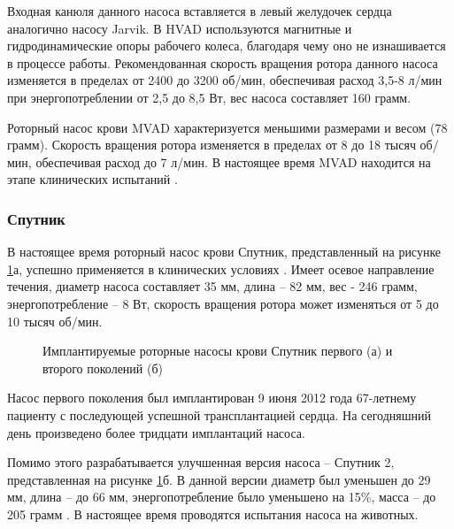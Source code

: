 Входная канюля данного насоса вставляется в левый желудочек сердца аналогично насосу Jarvik. В HVAD используются магнитные и гидродинамические опоры рабочего колеса, благодаря чему оно не изнашивается в процессе работы. Рекомендованная скорость вращения ротора данного насоса изменяется в пределах от 2400 до 3200 об/мин, обеспечивая расход 3,5-8 л/мин при энергопотреблении от 2,5 до 8,5 Вт, вес насоса составляет 160 грамм.

Роторный насос крови MVAD характеризуется меньшими размерами и весом (78 грамм). Скорость вращения ротора изменяется в пределах от 8 до 18 тысяч об/мин, обеспечивая расход до 7 л/мин. В настоящее время MVAD находится на этапе клинических испытаний \cite{cheung2015design}.

\subsubsection*{Спутник}

В настоящее время роторный насос крови Спутник, представленный на рисунке \ref{img:sputnik_pumps}а, успешно применяется в клинических условиях \cite{selishchev2015ventricular}. Имеет осевое направление течения, диаметр насоса составляет 35 мм, длина -- 82 мм, вес - 246 грамм, энергопотребление -- 8 Вт, скорость вращения ротора может изменяться от 5 до 10 тысяч об/мин.

\begin{figure}[ht]
  \begin{minipage}[ht]{0.48\linewidth}
  \end{minipage}
  \hfill
  \begin{minipage}[ht]{0.48\linewidth}
  \end{minipage}
  \caption{Имплантируемые роторные насосы крови Спутник первого (а) и второго поколений (б)}
  \label{img:sputnik_pumps}  
\end{figure}

Насос первого поколения был имплантирован 9 июня 2012 года 67-летнему пациенту с последующей успешной трансплантацией сердца. На сегодняшний день произведено более тридцати имплантаций насоса.

Помимо этого разрабатывается улучшенная версия насоса -- Спутник 2, представленная на рисунке \ref{img:sputnik_pumps}б. В данной версии диаметр был уменьшен до 29 мм, длина -- до 66 мм, энергопотребление было уменьшено на 15\%, масса -- до 205 грамм \cite{sputnik_upd}. В настоящее время проводятся испытания насоса на животных.

